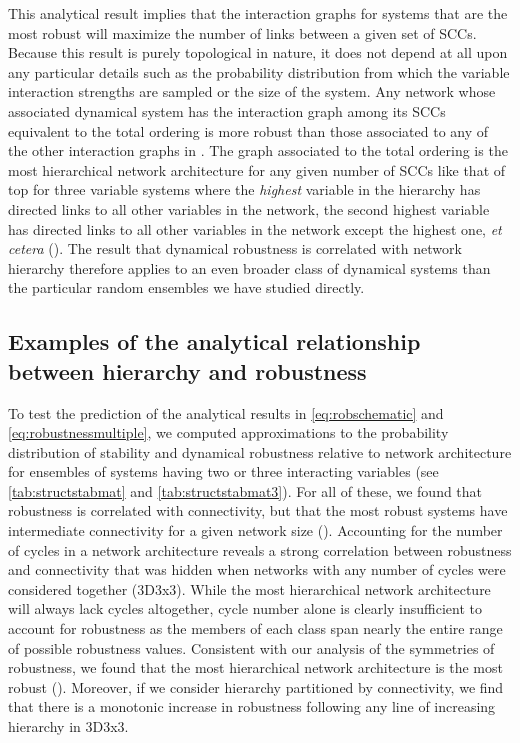 This analytical result implies that the interaction graphs for systems that are the most robust will maximize the number of links between a given set of SCCs. Because this result is purely topological in nature, it does not depend at all upon any particular details such as the probability distribution from which the variable interaction strengths are sampled or the size of the system. Any network whose associated dynamical system has the interaction graph among its SCCs equivalent to the total ordering is more robust than those associated to any of the other interaction graphs in . The graph associated to the total ordering is the most hierarchical network architecture for any given number of SCCs like that of  top for three variable systems where the \emph{highest} variable in the hierarchy has directed links to all other variables in the network, the second highest variable has directed links to all other variables in the network except the highest one, \emph{et cetera} (). The result that dynamical robustness is correlated with network hierarchy therefore applies to an even broader class of dynamical systems than the particular random ensembles we have studied directly.

\subsection{Examples of the analytical relationship between hierarchy and robustness}

To test the prediction of the analytical results in \ref{eq:robschematic} and \ref{eq:robustnessmultiple}, we computed approximations to the probability distribution of stability and dynamical robustness relative to network architecture for ensembles of systems having two or three interacting variables (see  \ref{tab:structstabmat} and \ref{tab:structstabmat3}). For all of these, we found that robustness is correlated with connectivity, but that the most robust systems have intermediate connectivity for a given network size (). Accounting for the number of cycles in a network architecture reveals a strong correlation between robustness and connectivity that was hidden when networks with any number of cycles were considered together (3D3x3). While the most hierarchical network architecture will always lack cycles altogether, cycle number alone is clearly insufficient to account for robustness as the members of each class span nearly the entire range of possible robustness values. Consistent with our analysis of the symmetries of robustness, we found that the most hierarchical network architecture is the most robust (). Moreover, if we consider hierarchy partitioned by connectivity, we find that there is a monotonic increase in robustness following any line of increasing hierarchy in 3D3x3.
